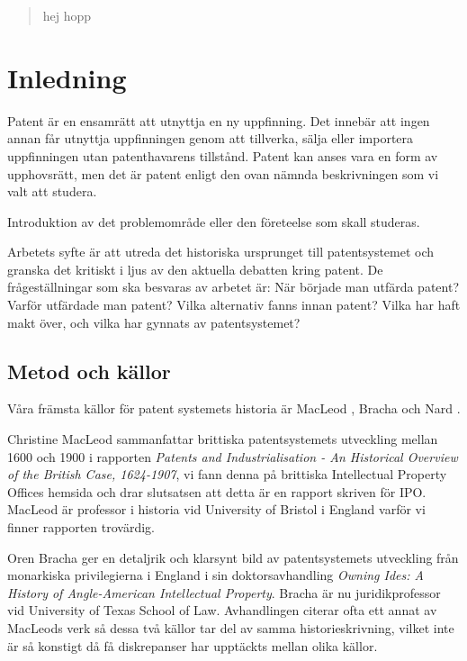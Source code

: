 
\begin{abstract}
	hej hopp
\end{abstract}	
	
	
\section{Inledning}

Patent är en ensamrätt att utnyttja en ny uppfinning. Det innebär att ingen
annan får utnyttja uppfinningen genom att tillverka, sälja eller importera 
uppfinningen utan patenthavarens tillstånd. Patent kan anses vara en form av
upphovsrätt, men det är patent enligt den ovan nämnda beskrivningen som vi valt
att studera.

Introduktion av det problemområde eller den företeelse som skall studeras. 

Arbetets syfte är att utreda det historiska ursprunget till patentsystemet och
granska det kritiskt i ljus av den aktuella debatten kring patent.
De frågeställningar som ska besvaras av arbetet är: När började man utfärda
patent? Varför utfärdade man patent? Vilka alternativ fanns innan 
patent? Vilka har haft makt över, och vilka har gynnats av patentsystemet?

\subsection{Metod och källor}

Våra främsta källor för patent systemets historia är MacLeod \cite{macleod}, Bracha \cite{bracha} och Nard
\cite{nard}.

Christine MacLeod sammanfattar brittiska patentsystemets utveckling mellan 
1600 och 1900 i rapporten \emph{Patents and Industrialisation - An Historical 
Overview of the British Case, 1624-1907}, vi fann denna på brittiska 
Intellectual Property Offices hemsida och drar slutsatsen att detta är en 
rapport skriven för IPO. MacLeod är professor i historia vid University of 
Bristol i England varför vi finner rapporten trovärdig.

Oren Bracha ger en detaljrik och klarsynt bild av patentsystemets utveckling 
från monarkiska privilegierna i England i sin doktorsavhandling \emph{Owning 
Ides: A History of Angle-American Intellectual Property}. Bracha är nu 
juridikprofessor vid University of Texas School of Law. Avhandlingen citerar 
ofta ett annat av MacLeods verk så dessa två källor tar del av samma 
historieskrivning, vilket inte är så konstigt då få diskrepanser har upptäckts 
mellan olika källor.

